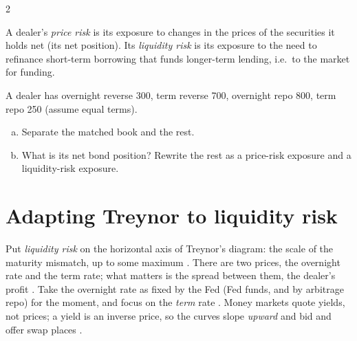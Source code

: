 \begin{paracol}{2}
\begin{definition}
A dealer's \emph{price risk} is its exposure to changes in the prices of the securities it holds net (its net position). Its \emph{liquidity risk} is its exposure to the
need to refinance short-term borrowing that funds longer-term lending, i.e.\ to the market for funding.
\end{definition}

\begin{exercise}
A dealer has overnight reverse 300, term reverse 700, overnight repo 800, term repo 250 (assume equal terms).
\begin{enumerate}[(a)]
  \item Separate the matched book and the rest.
  \item What is its net bond position? Rewrite the rest as a price-risk exposure and a liquidity-risk exposure.
\end{enumerate}
\end{exercise}

\section{Adapting Treynor to liquidity risk}\label{sec:bl-treynor}

Put \emph{liquidity risk} on the horizontal axis of Treynor's diagram: the scale of the maturity mismatch, up to some maximum . There are two prices,
the overnight rate and the term rate; what matters is the spread between them, the dealer's profit . Take the overnight rate as fixed by the Fed (Fed funds, and by
arbitrage repo) for the moment, and focus on the \emph{term} rate . Money markets quote yields, not prices; a yield is an inverse price, so the curves
slope \emph{upward} and bid and offer swap places .


\end{paracol}

